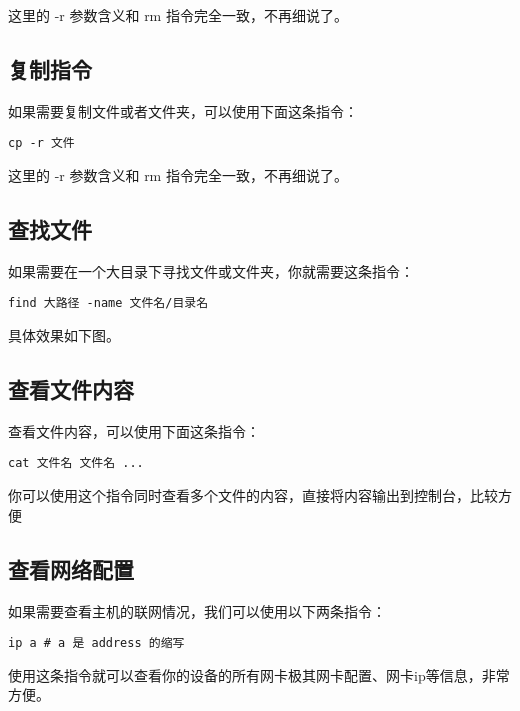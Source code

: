 \documentclass[UTF8]{gyh}
\begin{document}
这里的 -r 参数含义和 rm 指令完全一致，不再细说了。

\subsection{复制指令}

如果需要复制文件或者文件夹，可以使用下面这条指令：

\begin{lstlisting}
cp -r 文件
\end{lstlisting}

这里的 -r 参数含义和 rm 指令完全一致，不再细说了。

\subsection{查找文件}

如果需要在一个大目录下寻找文件或文件夹，你就需要这条指令：

\begin{lstlisting}
find 大路径 -name 文件名/目录名
\end{lstlisting}

具体效果如下图。


\subsection{查看文件内容}

查看文件内容，可以使用下面这条指令：

\begin{lstlisting}
cat 文件名 文件名 ...
\end{lstlisting}

你可以使用这个指令同时查看多个文件的内容，直接将内容输出到控制台，比较方便

\subsection{查看网络配置}

如果需要查看主机的联网情况，我们可以使用以下两条指令：

\begin{lstlisting}
ip a # a 是 address 的缩写
\end{lstlisting}

使用这条指令就可以查看你的设备的所有网卡极其网卡配置、网卡ip等信息，非常方便。

\end{document}
